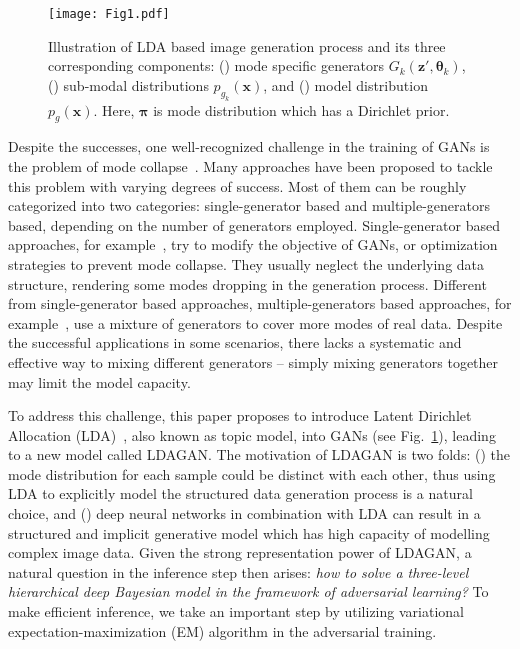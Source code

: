 \documentclass{article}
\begin{document}
\begin{figure}[t]
  \centering
    \texttt{[image: Fig1.pdf]}
     \caption{Illustration of LDA based image generation process and its three corresponding components: () mode specific generators $G_k\left(\mathbf{z}',\bm{\theta}_k\right)$, () sub-modal distributions $p_{g_k}\left(\mathbf{x}\right)$, and () model distribution $p_g\left(\mathbf{x}\right)$. Here, $\bm{\pi}$ is mode distribution which has a Dirichlet prior.}
     \label{fig:1}
\end{figure}

Despite the successes, one well-recognized challenge in the training of GANs is the problem of mode collapse~\cite{salimans2016improved,nguyen2017dual,miyato2018spectral,tran2018dist,tolstikhin2017adagan}.
Many approaches have been proposed to tackle this problem with varying degrees of success.
Most of them can be roughly categorized into two categories: single-generator based and multiple-generators based, depending on the number of generators employed.
Single-generator based approaches, for example~\cite{nguyen2017dual,miyato2018spectral,salimans2016improved,tran2018dist}, try to modify the objective of GANs, or optimization strategies to prevent mode collapse.
They usually neglect the underlying data structure, rendering some modes dropping in the generation process.
Different from single-generator based approaches, multiple-generators based approaches, for example~\cite{hoang2018mgan,tolstikhin2017adagan,arora2017generalization}, use a mixture of generators to cover more modes of real data. Despite the successful applications in some scenarios, there lacks a systematic and effective way to mixing different generators -- simply mixing generators together may limit the model capacity.


To address this challenge,
this paper proposes to introduce Latent Dirichlet Allocation (LDA)~\cite{blei2003latent}, also known as topic model, into GANs (see Fig.~\ref{fig:1}), leading to a new model called LDAGAN.
The motivation of LDAGAN is two folds: () the mode distribution for each sample could be distinct with each other, thus using LDA to explicitly model the structured data generation process is a natural choice, and () deep neural networks in combination with LDA can result in a structured and implicit generative model which has high capacity of modelling complex image data.
Given the strong representation power of LDAGAN, a natural question in the inference step then arises: \emph{how to solve a three-level hierarchical deep Bayesian model in the framework of adversarial learning?}
To make efficient inference, we take an important step by utilizing variational expectation-maximization (EM) algorithm in the adversarial training.
\end{document}
